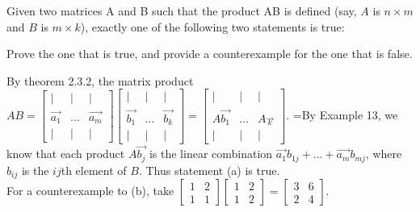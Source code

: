 \documentclass[12pt]{exam}
\begin{document}
\begin{questions}
\question Given two matrices A and B such that the product AB is defined (say, $A$ is $n \times m$ and $B$ is $m \times k$), exactly one of the following two statements is true:
    Prove the one that is true, and provide a counterexample for the one that is false.
    \begin{solution}
        By theorem 2.3.2, the matrix product $AB = \begin{bmatrix*}
            | & | &  | \\
            \vec{a_1} & ... & \vec{a_m} \\
            | & | & |
        \end{bmatrix*}\begin{bmatrix*}
            | & | &  | \\
            \vec{b_1} & ... & \vec{b_k} \\
            | & | & |
        \end{bmatrix*} = \begin{bmatrix*}
            | & | &  | \\
            A\vec{b_1} & ... & A\vec{_k} \\
            | & | & |
        \end{bmatrix*}$. =By Example 13, we know that each product $A\vec{b_j}$ is the linear combination $\vec{a_1} b_{1j} + ... + \vec{a_m} b_{mj}$, where $b_{ij}$ is the $ij$th element of $B$. Thus statement (a) is true.\\
        For a counterexample to (b), take $ \begin{bmatrix*}
        1 & 2 \\  1 & 1 
        \end{bmatrix*}\begin{bmatrix*}
            1 & 2 \\  1 & 2 
            \end{bmatrix*} = \begin{bmatrix*}
                3 & 6 \\  2 & 4 
                \end{bmatrix*}$.
    \end{solution}


\end{questions}
\end{document}
